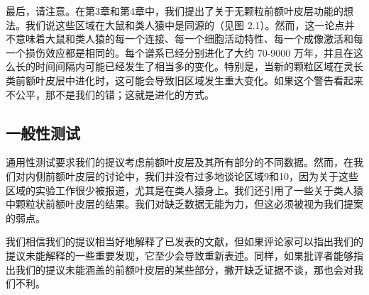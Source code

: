 \par 
最后，请注意。在第3章和第4章中，我们提出了关于无颗粒前额叶皮层功能的想法。我们说这些区域在大鼠和类人猿中是同源的（见图 2.1）。然而，这一论点并不意味着大鼠和类人猿的每一个连接、每一个细胞活动特性、每一个成像激活和每一个损伤效应都是相同的。每个谱系已经分别进化了大约 70-9000 万年，并且在这么长的时间间隔内可能已经发生了相当多的变化。特别是，当新的颗粒区域在灵长类前额叶皮层中进化时，这可能会导致旧区域发生重大变化。如果这个警告看起来不公平，那不是我们的错；这就是进化的方式。
\subsection{一般性测试}
通用性测试要求我们的提议考虑前额叶皮层及其所有部分的不同数据。然而，在我们对内侧前额叶皮层的讨论中，我们并没有过多地谈论区域9和10，因为关于这些区域的实验工作很少被报道，尤其是在类人猿身上。我们还引用了一些关于类人猿中颗粒状前额叶皮层的结果。我们对缺乏数据无能为力，但这必须被视为我们提案的弱点。
\par 
我们相信我们的提议相当好地解释了已发表的文献，但如果评论家可以指出我们的提议未能解释的一些重要发现，它至少会导致重新表述。同样，如果批评者能够指出我们的提议未能涵盖的前额叶皮层的某些部分，撇开缺乏证据不谈，那也会对我们不利。
